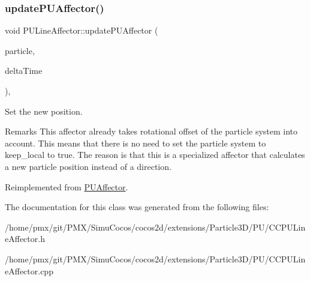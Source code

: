 \subsubsection{\texorpdfstring{update\+P\+U\+Affector()}{updatePUAffector()}}
{\footnotesize\ttfamily void P\+U\+Line\+Affector\+::update\+P\+U\+Affector (\begin{DoxyParamCaption}\item[{\hyperlink{structPUParticle3D}{P\+U\+Particle3D} $\ast$}]{particle,  }\item[{float}]{delta\+Time }\end{DoxyParamCaption})\hspace{0.3cm}{\ttfamily [override]}, {\ttfamily [virtual]}}

Set the new position. \begin{DoxyRemark}{Remarks}
This affector already takes rotational offset of the particle system into account. This means that there is no need to set the particle system to keep\+\_\+local to \textquotesingle{}true\textquotesingle{}. The reason is that this is a specialized affector that calculates a new particle position instead of a direction.
\end{DoxyRemark}


Reimplemented from \hyperlink{classPUAffector}{P\+U\+Affector}.



The documentation for this class was generated from the following files\+:\begin{DoxyCompactItemize}
\item 
/home/pmx/git/\+P\+M\+X/\+Simu\+Cocos/cocos2d/extensions/\+Particle3\+D/\+P\+U/C\+C\+P\+U\+Line\+Affector.\+h\item 
/home/pmx/git/\+P\+M\+X/\+Simu\+Cocos/cocos2d/extensions/\+Particle3\+D/\+P\+U/C\+C\+P\+U\+Line\+Affector.\+cpp\end{DoxyCompactItemize}
